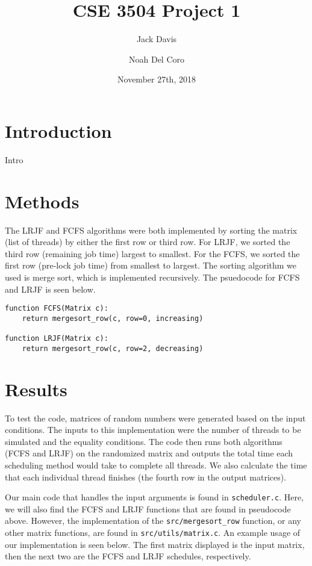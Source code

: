 \documentclass[letterpaper,12pt]{article}
\begin{document}
\title{CSE 3504  Project 1}
\author[1]{Jack Davis}
\author[1]{Noah Del Coro}
\date{November 27th, 2018}
\maketitle

\section{Introduction}
Intro


\section{Methods}
The LRJF and FCFS algorithms were both implemented by sorting the matrix (list of threads) by either the first row or third row. 
For LRJF, we sorted the third row (remaining job time) largest to smallest.
For the FCFS, we sorted the first row (pre-lock job time) from smallest to largest.
The sorting algorithm we used is merge sort, which is implemented recursively. 
The psuedocode for FCFS and LRJF is seen below.
\begin{verbatim}
function FCFS(Matrix c):
    return mergesort_row(c, row=0, increasing)
    
function LRJF(Matrix c):
    return mergesort_row(c, row=2, decreasing)
\end{verbatim}


\section{Results}

To test the code, matrices of random numbers were generated based on the input conditions.
The inputs to this implementation were the number of threads to be simulated and the equality conditions.
The code then runs both algorithms (FCFS and LRJF) on the randomized matrix and outputs the total time each scheduling method would take to complete all threads. 
We also calculate the time that each individual thread finishes (the fourth row in the output matrices). 

Our main code that handles the input arguments is found in \texttt{scheduler.c}.
Here, we will also find the FCFS and LRJF functions that are found in pseudocode above.
However, the implementation of the \texttt{src/mergesort\_row} function, or any other matrix functions, are found in \texttt{src/utils/matrix.c}.
An example usage of our implementation is seen below. 
The first matrix displayed is the input matrix, then the next two are the FCFS and LRJF schedules, respectively.
\end{document}
